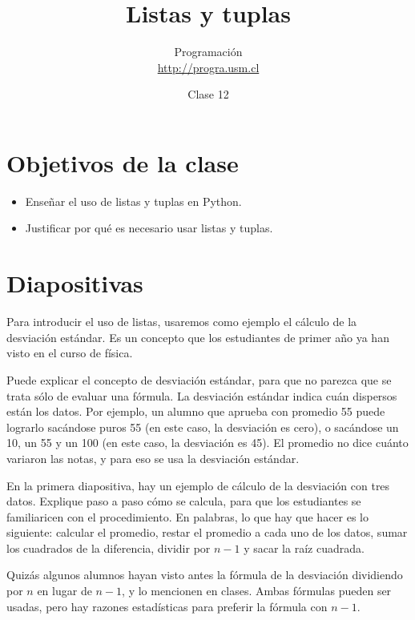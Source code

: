 \documentclass[10pt]{article}
\title{Listas y tuplas}
\author{Programación \\ \url{http://progra.usm.cl}}
\date{Clase 12}
\begin{document}
  \maketitle

  \section*{Objetivos de la clase}
  \begin{itemize}
    \item Enseñar el uso de listas y tuplas en Python.
    \item Justificar por qué es necesario
      usar listas y tuplas.
  \end{itemize}

  \section*{Diapositivas}


  Para introducir el uso de listas,
  usaremos como ejemplo el cálculo de la desviación estándar.
  Es un concepto que los estudiantes de primer año
  ya han visto en el curso de física.

  Puede explicar el concepto de desviación estándar,
  para que no parezca que se trata sólo de evaluar una fórmula.
  La desviación estándar indica cuán dispersos están los datos.
  Por ejemplo,
  un alumno que aprueba con promedio 55 puede lograrlo
  sacándose puros 55 (en este caso, la desviación es cero),
  o sacándose un 10, un 55 y un 100 (en este caso, la desviación es 45).
  El promedio no dice cuánto variaron las notas,
  y para eso se usa la desviación estándar.

  En la primera diapositiva,
  hay un ejemplo de cálculo de la desviación
  con tres datos.
  Explique paso a paso cómo se calcula,
  para que los estudiantes se familiaricen con el procedimiento.
  En palabras,
  lo que hay que hacer es lo siguiente:
  calcular el promedio,
  restar el promedio a cada uno de los datos,
  sumar los cuadrados de la diferencia,
  dividir por \(n - 1\) y sacar la raíz cuadrada.

  Quizás algunos alumnos hayan visto antes
  la fórmula de la desviación dividiendo por \(n\) en lugar de \(n - 1\),
  y lo mencionen en clases.
  Ambas fórmulas pueden ser usadas,
  pero hay razones estadísticas para preferir la fórmula con \(n - 1\).

\end{document}
